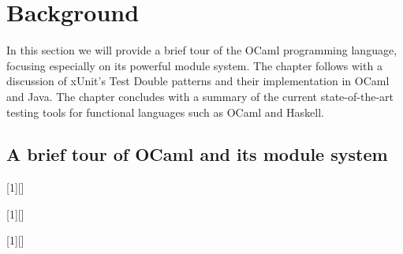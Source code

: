 
\chapter{Background}
\label{background}

In this section we will provide a brief tour of the OCaml programming
language, focusing especially on its powerful module system. The
chapter follows with a discussion of xUnit's Test Double patterns and
their implementation in OCaml and Java. The chapter concludes with a
summary of the current state-of-the-art testing tools for functional
languages such as OCaml and Haskell.

\section{A brief tour of OCaml and its module system}
\label{ocaml}

[1][]%
  {\minipage{\linewidth} 
    }
  {\endminipage}

[1][]%
  {\minipage{\linewidth} 
    }
  {\endminipage}

[1][]%
  {\minipage{\linewidth} 
    \lstset{
      basicstyle=\ttfamily\footnotesize,
      language=Java,
      aboveskip=-\baselineskip,
      #1}}
  {\endminipage}


